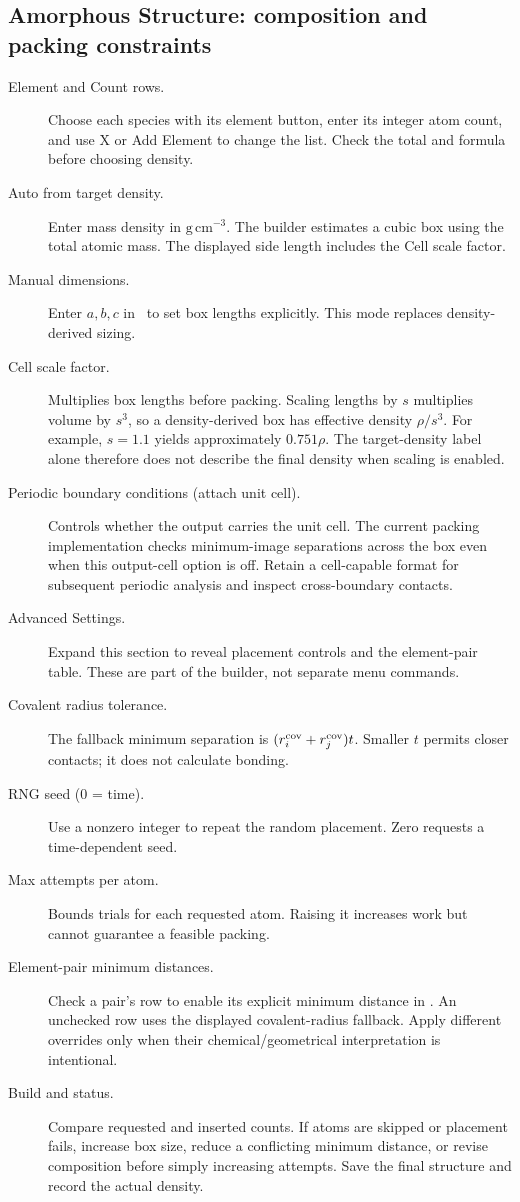 \subsection{Amorphous Structure: composition and packing constraints}
\begin{description}
\item[Element and Count rows.] Choose each species with its element button, enter its integer atom count, and use X or Add Element to change the list. Check the total and formula before choosing density.
\item[Auto from target density.] Enter mass density in $\mathrm{g\,cm^{-3}}$. The builder estimates a cubic box using the total atomic mass. The displayed side length includes the Cell scale factor.
\item[Manual dimensions.] Enter $a,b,c$ in \angstrom\ to set box lengths explicitly. This mode replaces density-derived sizing.
\item[Cell scale factor.] Multiplies box lengths before packing. Scaling lengths by $s$ multiplies volume by $s^3$, so a density-derived box has effective density $\rho/s^3$. For example, $s=1.1$ yields approximately $0.751\rho$. The target-density label alone therefore does not describe the final density when scaling is enabled.
\item[Periodic boundary conditions (attach unit cell).] Controls whether the output carries the unit cell. The current packing implementation checks minimum-image separations across the box even when this output-cell option is off. Retain a cell-capable format for subsequent periodic analysis and inspect cross-boundary contacts.
\item[Advanced Settings.] Expand this section to reveal placement controls and the element-pair table. These are part of the builder, not separate menu commands.
\item[Covalent radius tolerance.] The fallback minimum separation is $(r_i^{\rm cov}+r_j^{\rm cov})t$. Smaller $t$ permits closer contacts; it does not calculate bonding.
\item[RNG seed (0 = time).] Use a nonzero integer to repeat the random placement. Zero requests a time-dependent seed.
\item[Max attempts per atom.] Bounds trials for each requested atom. Raising it increases work but cannot guarantee a feasible packing.
\item[Element-pair minimum distances.] Check a pair's row to enable its explicit minimum distance in \angstrom. An unchecked row uses the displayed covalent-radius fallback. Apply different overrides only when their chemical/geometrical interpretation is intentional.
\item[Build and status.] Compare requested and inserted counts. If atoms are skipped or placement fails, increase box size, reduce a conflicting minimum distance, or revise composition before simply increasing attempts. Save the final structure and record the actual density.
\end{description}

